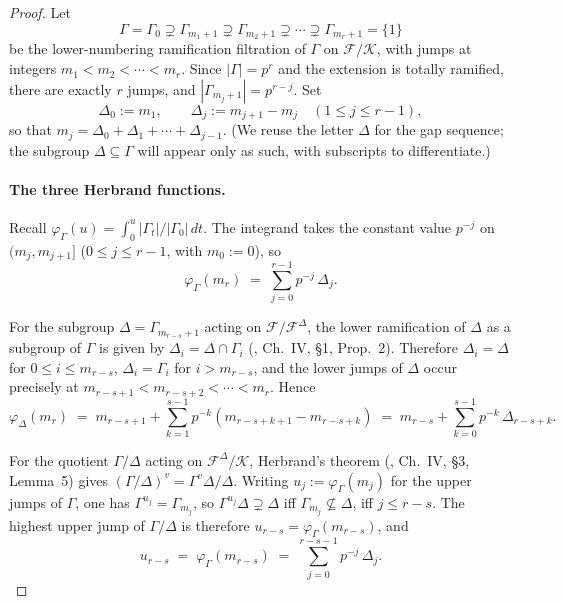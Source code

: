 \documentclass[11pt]{article}
\begin{document}
\begin{proof}
Let
\[
\Gamma = \Gamma_0 \supsetneq \Gamma_{m_1+1} \supsetneq \Gamma_{m_2+1} \supsetneq
\cdots \supsetneq \Gamma_{m_r+1} = \{1\}
\]
be the lower-numbering ramification filtration of $\Gamma$ on
$\mathcal{F}/\mathcal{K}$, with jumps at integers $m_1 < m_2 < \cdots < m_r$.
Since $|\Gamma| = p^r$ and the extension is totally ramified, there are exactly
$r$ jumps, and $|\Gamma_{m_j+1}| = p^{r-j}$. Set
\[
\Delta_0 := m_1, \qquad \Delta_j := m_{j+1} - m_j \quad (1 \leq j \leq r-1),
\]
so that $m_j = \Delta_0 + \Delta_1 + \cdots + \Delta_{j-1}$. (We reuse the
letter $\Delta$ for the gap sequence; the subgroup $\Delta \subseteq \Gamma$
will appear only as such, with subscripts to differentiate.)

\paragraph{The three Herbrand functions.}
Recall $\varphi_\Gamma(u) = \int_0^u |\Gamma_t|/|\Gamma_0|\,dt$. The integrand
takes the constant value $p^{-j}$ on $(m_j, m_{j+1}]$ ($0 \leq j \leq r-1$,
with $m_0 := 0$), so
\begin{equation}\label{eq:phi-Gamma}
\varphi_\Gamma(m_r) \;=\; \sum_{j=0}^{r-1} p^{-j}\,\Delta_j.
\end{equation}

For the subgroup $\Delta = \Gamma_{m_{r-s}+1}$ acting on
$\mathcal{F}/\mathcal{F}^\Delta$, the lower ramification of $\Delta$ as a
subgroup of $\Gamma$ is given by $\Delta_i = \Delta \cap \Gamma_i$
(\cite{Serre1979}, Ch.~IV, \S1, Prop.~2). Therefore $\Delta_i = \Delta$ for
$0 \leq i \leq m_{r-s}$, $\Delta_i = \Gamma_i$ for $i > m_{r-s}$, and the lower
jumps of $\Delta$ occur precisely at $m_{r-s+1} < m_{r-s+2} < \cdots < m_r$.
Hence
\begin{equation}\label{eq:phi-Delta}
\varphi_\Delta(m_r) \;=\; m_{r-s+1}
   + \sum_{k=1}^{s-1} p^{-k}(m_{r-s+k+1} - m_{r-s+k})
   \;=\; m_{r-s} + \sum_{k=0}^{s-1} p^{-k}\,\Delta_{r-s+k}.
\end{equation}

For the quotient $\Gamma/\Delta$ acting on $\mathcal{F}^\Delta/\mathcal{K}$,
Herbrand's theorem (\cite{Serre1979}, Ch.~IV, \S3, Lemma~5) gives
$(\Gamma/\Delta)^v = \Gamma^v \Delta / \Delta$. Writing
$u_j := \varphi_\Gamma(m_j)$ for the upper jumps of $\Gamma$, one has
$\Gamma^{u_j} = \Gamma_{m_j}$, so $\Gamma^{u_j} \Delta \supsetneq \Delta$ iff
$\Gamma_{m_j} \not\subseteq \Delta$, iff $j \leq r-s$. The highest upper jump of
$\Gamma/\Delta$ is therefore $u_{r-s} = \varphi_\Gamma(m_{r-s})$, and
\begin{equation}\label{eq:phi-quotient}
u_{r-s} \;=\; \varphi_\Gamma(m_{r-s}) \;=\; \sum_{j=0}^{r-s-1} p^{-j}\,\Delta_j.
\end{equation}


\end{proof}
\end{document}
